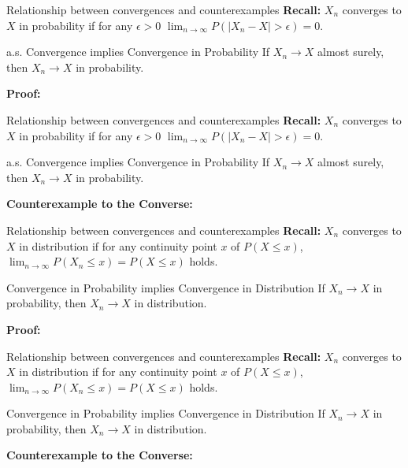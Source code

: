 \documentclass [aspectratio=169]{beamer}
\begin{document}
\begin{frame}{Relationship between convergences and counterexamples}
    \textbf{Recall:} $X_n$ converges to $X$ in probability if for any $\epsilon>0$ $\lim_{n\to \infty}P(|X_n - X|>\epsilon)=0$.\\
    \begin{block}{a.s. Convergence implies Convergence in Probability}
    If $X_n \to X$ almost surely, then $X_n \to X$ in probability. 
    \end{block}
    \textbf{Proof: }
    \vspace{1.8in}
\end{frame}

\begin{frame}{Relationship between convergences and counterexamples}
    \textbf{Recall:} $X_n$ converges to $X$ in probability if for any $\epsilon>0$ $\lim_{n\to \infty}P(|X_n - X|>\epsilon)=0$.\\
    \begin{block}{a.s. Convergence implies Convergence in Probability}
    If $X_n \to X$ almost surely, then $X_n \to X$ in probability. 
    \end{block}
    \textbf{Counterexample to the Converse: }
    \vspace{1.8in}
\end{frame}

\begin{frame}{Relationship between convergences and counterexamples}
    \textbf{Recall:} $X_n$ converges to $X$ in distribution if for any continuity point $x$ of $P(X\leq x)$, $\lim_{n\to \infty}P(X_n \leq x) = P(X\leq x)$ holds.\\
    \begin{block}{Convergence in Probability implies Convergence in Distribution}
    If $X_n \to X$ in probability, then $X_n \to X$ in distribution. 
    \end{block}
    \textbf{Proof: }
    \vspace{1.8in}
\end{frame}

\begin{frame}{Relationship between convergences and counterexamples}
    \textbf{Recall:} $X_n$ converges to $X$ in distribution if for any continuity point $x$ of $P(X\leq x)$, $\lim_{n\to \infty}P(X_n \leq x) = P(X\leq x)$ holds.\\
    \begin{block}{Convergence in Probability implies Convergence in Distribution}
    If $X_n \to X$ in probability, then $X_n \to X$ in distribution. 
    \end{block}
    \textbf{Counterexample to the Converse: }
    \vspace{1.8in}
\end{frame}
\end{document}
